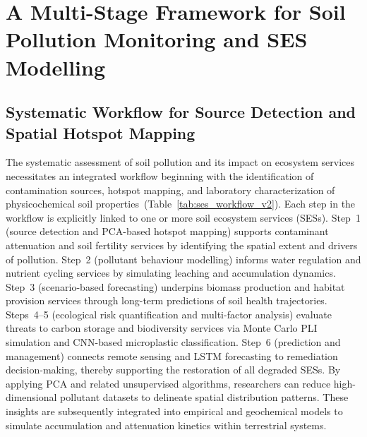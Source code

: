 \documentclass[environremediat,article,accept,pdftex,oneauthor]{Definitions/mdpi}
\begin{document}
\section{A Multi-Stage Framework for Soil Pollution Monitoring and \linebreak SES
    Modelling}\label{sec4}

\subsection{Systematic Workflow for Source Detection and Spatial Hotspot
    Mapping}\label{sec4.1}

The systematic assessment of soil pollution and its impact on ecosystem services necessitates an integrated workflow beginning with the identification of contamination sources, hotspot mapping, and laboratory characterization of physicochemical soil properties\mbox{ (Table~\ref{tab:ses_workflow_v2}).} {Each step in the workflow is explicitly linked to one or more soil ecosystem services (SESs). Step~1 (source detection and PCA-based hotspot mapping) supports contaminant attenuation %
 and soil fertility services by identifying the spatial extent and drivers of pollution. Step~2 (pollutant behaviour modelling) informs water regulation and nutrient cycling services by simulating leaching and accumulation dynamics. Step~3 (scenario-based forecasting) underpins biomass production and habitat provision services through long-term predictions of soil health trajectories. Steps~4--5 (ecological risk quantification and multi-factor analysis) evaluate threats to carbon storage and biodiversity services via Monte Carlo PLI simulation and CNN-based microplastic classification. Step~6 (prediction and management) connects remote sensing and LSTM forecasting to remediation decision-making, thereby supporting the restoration of all degraded SESs.} By applying PCA and related unsupervised algorithms, researchers can reduce high-dimensional pollutant datasets to delineate spatial distribution patterns. These insights are subsequently integrated into empirical and geochemical models to simulate accumulation and attenuation kinetics within terrestrial systems.
\end{document}
